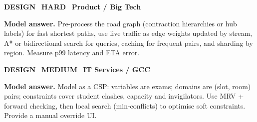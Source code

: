 \begin{tcolorbox}[enhanced,breakable,colback=white,colframe=crimson,arc=2mm,boxrule=0.8pt,left=3mm,right=3mm,
 title={\textbf{QII.10}\quad Design the route engine for a ride-hailing app serving a city of 10 million people.},fonttitle=\color{white}\small,colbacktitle=crimson]
\colorbox{crimson!15}{\scriptsize\bfseries\color{crimson} DESIGN}\
\colorbox{crimson!15}{\scriptsize\bfseries\color{crimson} HARD}\
\colorbox{navy!8}{\scriptsize\bfseries\color{navy} Product / Big Tech}\par\smallskip
\textbf{\color{navy}Model answer.} Pre-process the road graph (contraction hierarchies or hub labels) for fast shortest paths, use live traffic as edge weights updated by stream, A* or bidirectional search for queries, caching for frequent pairs, and sharding by region. Measure p99 latency and ETA error.
\end{tcolorbox}
\begin{tcolorbox}[enhanced,breakable,colback=white,colframe=crimson,arc=2mm,boxrule=0.8pt,left=3mm,right=3mm,
 title={\textbf{QII.11}\quad Design an exam-timetabling system for a university.},fonttitle=\color{white}\small,colbacktitle=crimson]
\colorbox{crimson!15}{\scriptsize\bfseries\color{crimson} DESIGN}\
\colorbox{gold!85!black!15}{\scriptsize\bfseries\color{gold!85!black} MEDIUM}\
\colorbox{navy!8}{\scriptsize\bfseries\color{navy} IT Services / GCC}\par\smallskip
\textbf{\color{navy}Model answer.} Model as a CSP: variables are exams; domains are (slot, room) pairs; constraints cover student clashes, capacity and invigilators. Use MRV + forward checking, then local search (min-conflicts) to optimise soft constraints. Provide a manual override UI.
\end{tcolorbox}